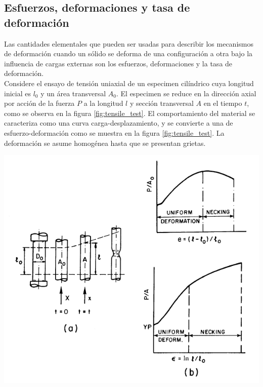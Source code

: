 \subsection{Esfuerzos, deformaciones y tasa de deformación}

Las cantidades elementales que pueden ser usadas para describir los mecanismos de deformación 
cuando un sólido se deforma de una configuración a otra bajo la influencia de cargas externas 
son los esfuerzos, deformaciones y la tasa de deformación. ~\cite{kobayashi1989} \\

Considere el ensayo de tensión uniaxial de un especimen cilíndrico cuya longitud inicial 
es $l_0$ y un área transversal $A_0$. El especimen se reduce en la dirección axial 
por acción de la fuerza $P$ a la longitud $l$ y sección transversal $A$ en el tiempo 
$t$, como se observa en la figura \ref{fig:tensile_test}. El comportamiento del material 
se caracteriza como una curva carga-desplazamiento, y se convierte a una de 
esfuerzo-deformación como se muestra en la figura \ref{fig:tensile_test}. La deformación 
se asume homogénea hasta que se presentan grietas. ~\cite{kobayashi1989} \\

\begin{center}
\includegraphics[scale=0.8]{src/ch2/tensile_test.png}
\label{fig:tensile_test}
\end{center}

